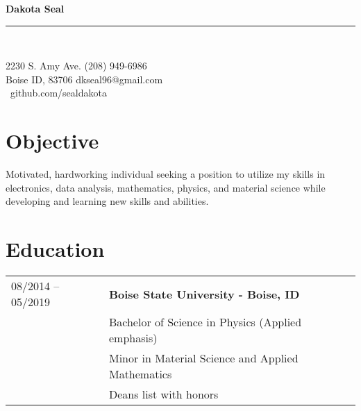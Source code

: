 \documentclass[a4paper,12pt]{article}
\newcommand{\cstmheading}[2]%
        {\begin{minipage}[t]{\textwidth}%
                 {\LARGE \bfseries #1} \\[-0.3\baselineskip]%
                 \rule{\columnwidth}{1.5pt}\\[0.1\baselineskip]
         \end{minipage}}
\begin{document}
\cstmheading{Dakota Seal}\\
2230 S. Amy Ave. \hfill (208) 949-6986 \\
Boise ID, 83706 \hfill dkseal96@gmail.com \\
\-\ \hfill github.com/sealdakota


\section{Objective}
Motivated, hardworking individual seeking a position to utilize my skills in electronics, data analysis, mathematics, physics, 
and material science while developing and learning new skills and abilities. 


\section{Education}
\begin{tabular}{ll}%
08/2014 -- 05/2019 & \textbf{Boise State University - Boise, ID} \\
         & Bachelor of Science in Physics (Applied emphasis) \\
         & Minor in Material Science and Applied Mathematics \\
         & Deans list with honors\\

\end{tabular}
\end{document}
